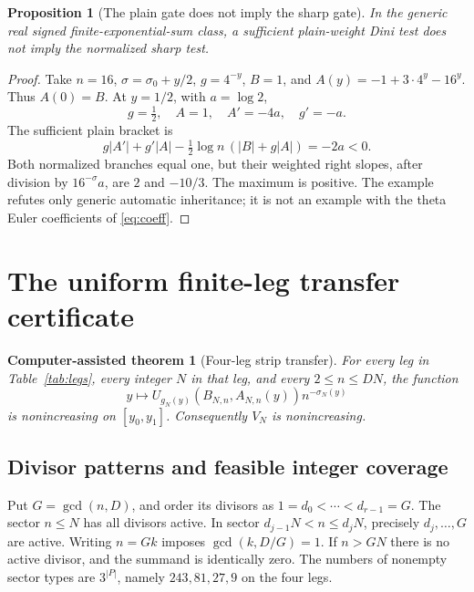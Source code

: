 \documentclass[11pt]{article}
\newtheorem{certtheorem}[theorem]{Computer-assisted theorem}
\newtheorem{proposition}[theorem]{Proposition}
\theoremstyle{remark}
\numberwithin{equation}{section}
\begin{document}
\begin{proposition}[The plain gate does not imply the sharp gate]\label{prop:counter}
In the generic real signed finite-exponential-sum class, a sufficient
plain-weight Dini test does not imply the normalized sharp test.
\end{proposition}
\begin{proof}
Take $n=16$, $\sigma=\sigma_0+y/2$, $g=4^{-y}$, $B=1$, and
$A(y)=-1+3\cdot4^y-16^y$. Thus $A(0)=B$. At $y=1/2$, with $a=\log2$,
\[
 g=\tfrac12,\quad A=1,\quad A'=-4a,\quad g'=-a.
\]
The sufficient plain bracket is
\[
 g|A'|+g'|A|-\tfrac12\log n\,(|B|+g|A|)=-2a<0.
\]
Both normalized branches equal one, but their weighted right slopes,
after division by $16^{-\sigma}a$, are $2$ and $-10/3$. The maximum is
positive. The example refutes only generic automatic inheritance; it is
not an example with the theta Euler coefficients of \eqref{eq:coeff}.
\end{proof}

\section{The uniform finite-leg transfer certificate}\label{sec:transfer}

\begin{certtheorem}[Four-leg strip transfer]\label{thm:transfer}
For every leg in Table~\ref{tab:legs}, every integer $N$ in that leg, and
every $2\le n\le DN$, the function
\[
 y\longmapsto U_{g_N(y)}(B_{N,n},A_{N,n}(y))n^{-\sigma_N(y)}
\]
is nonincreasing on $[y_0,y_1]$. Consequently $V_N$ is nonincreasing.
\end{certtheorem}

\subsection{Divisor patterns and feasible integer coverage}

Put $G=\gcd(n,D)$, and order its divisors as $1=d_0<\cdots<d_{r-1}=G$.
The sector $n\le N$ has all divisors active. In sector
$d_{j-1}N<n\le d_jN$, precisely $d_j,\ldots,G$ are active. Writing
$n=Gk$ imposes $\gcd(k,D/G)=1$. If $n>GN$ there is no active divisor,
and the summand is identically zero. The numbers of nonempty sector
types are $3^{|P|}$, namely $243,81,27,9$ on the four legs.
\end{document}
